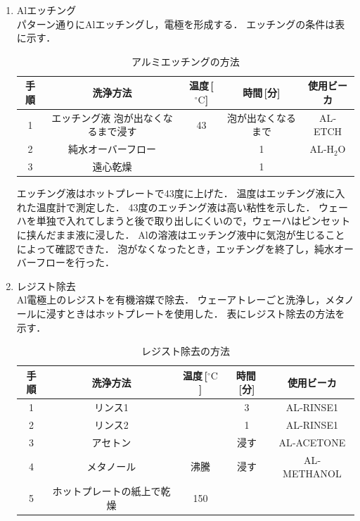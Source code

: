 \documentclass[11pt]{jarticle}
\begin{document}
\begin{enumerate}
			\item Alエッチング\\
				パターン通りにAlエッチングし，電極を形成する．
				エッチングの条件は表に示す．
				\begin{table}[H]
				\begin{center}
				\caption{アルミエッチングの方法}
				\label{tab:aletching}
				\begin{tabular}{c|cccc} \toprule
					手順&洗浄方法&温度\,[$^\circ \mathrm{C}$]&時間\,[分]&使用ビーカ\\ \hline
					1&エッチング液 泡が出なくなるまで浸す&43&泡が出なくなるまで&AL‐ETCH\\
					2&純水オーバーフロー&&1&AL‐$\mathrm{H_{2}O}$\\
					3&遠心乾燥&&1&\\ \bottomrule
				\end{tabular}
				\end{center}
				\end{table}
				エッチング液はホットプレートで43度に上げた．
				温度はエッチング液に入れた温度計で測定した．
				43度のエッチング液は高い粘性を示した．
				ウェーハを単独で入れてしまうと後で取り出しにくいので，ウェーハはピンセットに挟んだまま液に浸した．
				Alの溶液はエッチング液中に気泡が生じることによって確認できた．
				泡がなくなったとき，エッチングを終了し，純水オーバーフローを行った．

			\item レジスト除去\\
				Al電極上のレジストを有機溶媒で除去．
				ウェーアトレーごと洗浄し，メタノールに浸すときはホットプレートを使用した．
				表にレジスト除去の方法を示す．
				\begin{table}[H]
				\begin{center}
				\caption{レジスト除去の方法}
				\label{tab:resistwash}
				\begin{tabular}{c|cccc} \toprule
					手順&洗浄方法&温度\,[$^\circ \mathrm{C}$]&時間\,[分]&使用ビーカ\\ \hline
					1&リンス1&&3&AL‐RINSE1\\
					2&リンス2&&1&AL‐RINSE1\\
					3&アセトン&&浸す&AL‐ACETONE\\
					4&メタノール&沸騰&浸す&AL‐METHANOL\\
					5&ホットプレートの紙上で乾燥&150&&\\ \bottomrule
				\end{tabular}
				\end{center}
				\end{table}


\end{enumerate}
\end{document}
